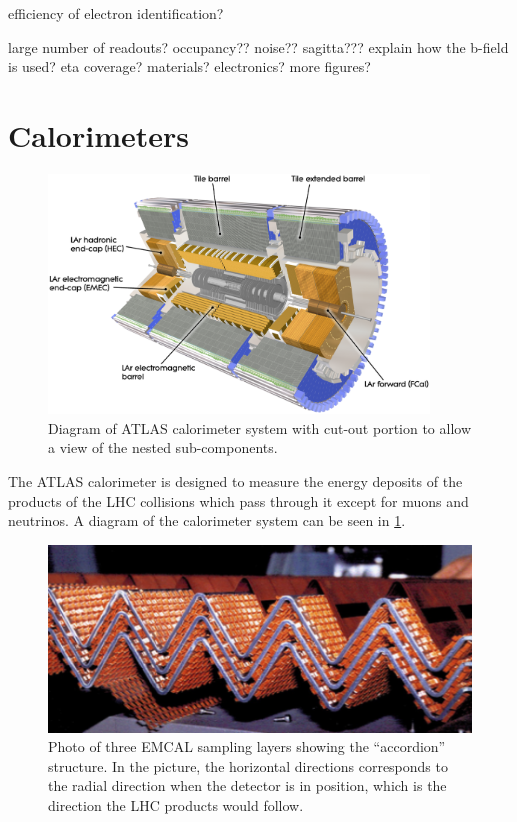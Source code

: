 efficiency of electron identification?


large number of readouts?
occupancy??
noise??
sagitta???
explain how the b-field is used?
eta coverage?
materials?
electronics?
more figures?



\section{Calorimeters }
\begin{figure}[ht!]
\centering
\includegraphics[width=0.9\textwidth]{figures/atlas/calorimeter.eps}
\caption{Diagram of ATLAS calorimeter system with cut-out portion
to allow a view of the nested sub-components.}
\label{fig:atlas_calorimeter}
\end{figure}

The ATLAS calorimeter is designed to measure the energy
deposits of the products of the LHC collisions which pass through
it except for muons and neutrinos.  A diagram of the 
calorimeter system can be seen in \fig\ref{fig:atlas_calorimeter}.

\begin{figure}[ht]
\centering
\includegraphics[width=.5\textwidth]{figures/atlas/emcal_accordion.png}
\caption{Photo of three EMCAL sampling layers
showing the ``accordion'' structure. In the picture, 
the horizontal directions corresponds to 
the radial direction when the detector is in position, which is
the direction the LHC products would follow.}
\label{fig:atlas_emcal_accordion}
\end{figure}

